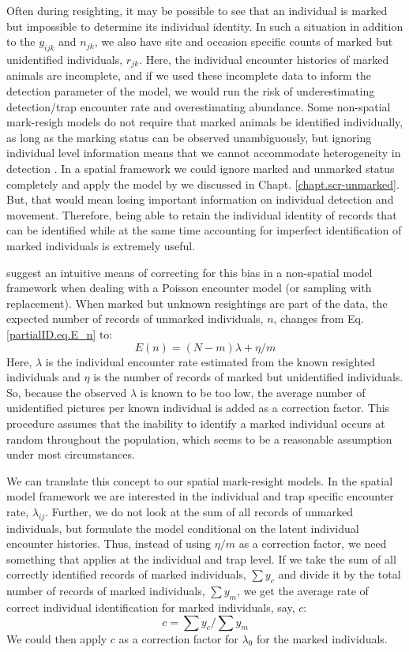 Often during resighting, it may be possible to see that an individual
is marked but impossible to determine its individual identity. In such
a situation in addition to the $y_{ijk}$ and $n_{jk}$, we also have
site and occasion specific counts of marked but unidentified
individuals, $r_{jk}$. Here, the individual encounter histories of
marked animals are incomplete, and if we used these incomplete data to
inform the detection parameter of the model, we would run the risk of
underestimating detection/trap encounter rate and overestimating
abundance. Some non-spatial mark-resigh models do not require that
marked animals be identified individually, as long as the marking
status can be observed unambiguously, but ignoring individual level
information means that we cannot accommodate heterogeneity in
detection \citep{mcclintock_white:2010}. In a spatial framework we
could ignore marked and unmarked status completely and apply the model
by \citet{chandler_royle:2012} we discussed in
Chapt. \ref{chapt.scr-unmarked}. But, that would mean losing
important information on individual detection and movement. Therefore,
being able to retain the individual identity of records that can be
identified while at the same time accounting for imperfect identification of marked individuals is extremely useful.

\citet{mcclintock_etal:2009biometrics,mcclintock_etal:2009mdp} suggest
an intuitive means of correcting for this bias in a non-spatial model
framework when dealing with a Poisson encounter model (or sampling
with replacement). When marked but unknown resightings are part of the
data, the expected number of records of unmarked individuals, $n$, changes from Eq. \ref{partialID.eq.E_n} to:
\[
E(n) = (N-m) { \lambda  + \eta/m}
\]
Here, $\lambda$ is the individual encounter rate estimated from the known resighted individuals and $\eta$ is the number of records of marked but unidentified individuals. So, because the observed $\lambda$ is known to be too low, the average number of unidentified pictures per known individual is added as a correction factor. This procedure assumes that the inability to identify a marked individual occurs at random throughout the population, which seems to be a reasonable assumption under most circumstances.


We can
translate this concept to our spatial
mark-resight models. In the spatial model framework we are interested
in the individual and trap specific encounter rate,
$\lambda_{ij}$. Further, we do not look at the sum of all records of
unmarked individuals, but formulate the model conditional on the
latent individual encounter histories. Thus, instead of using $\eta/m$
as a correction factor, we need something that applies at the
individual and trap level. If we take the sum of all correctly
identified records of marked individuals, $\sum y_c$ and divide it by
the total number of records of marked individuals, $\sum y_m$, we get
the average rate of correct individual identification for marked
individuals, say, $c$:
\[
c = \sum y_c/\sum y_m
\]
We could then apply $c$ as a correction factor for $\lambda_0$ for the marked individuals.

